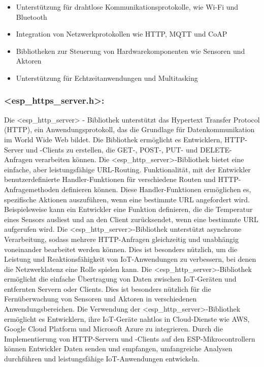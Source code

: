 \begin{itemize}
    \item Unterstützung für drahtlose Kommunikationsprotokolle, wie Wi-Fi und Bluetooth
    \item Integration von Netzwerkprotokollen wie HTTP, MQTT und CoAP
    \item Bibliotheken zur Steuerung von Hardwarekomponenten wie Sensoren und Aktoren
    \item Unterstützung für Echtzeitanwendungen und Multitasking
\end{itemize}

\subsubsection*{<esp\_https\_server.h>:}

Die <esp\_http\_server> - Bibliothek unterstützt das Hypertext Transfer Protocol (HTTP), ein Anwendungsprotokoll, das die Grundlage für Datenkommunikation im World Wide Web bildet. 
Die Bibliothek ermöglicht es Entwicklern, HTTP-Server und -Clients zu erstellen, die GET-, POST-, PUT- und DELETE-Anfragen verarbeiten können.
Die <esp\_http\_server>-Bibliothek bietet eine einfache, aber leistungsfähige URL-Routing.
Funktionalität, mit der Entwickler benutzerdefinierte Handler-Funktionen für verschiedene Routen und HTTP-Anfragemethoden definieren können. 
Diese Handler-Funktionen ermöglichen es, spezifische Aktionen auszuführen, wenn eine bestimmte URL angefordert wird. 
Beispielsweise kann ein Entwickler eine Funktion definieren, die die Temperatur eines Sensors ausliest und an den Client zurücksendet, wenn eine bestimmte URL aufgerufen wird.
Die <esp\_http\_server>-Bibliothek unterstützt asynchrone Verarbeitung, sodass mehrere HTTP-Anfragen gleichzeitig und unabhängig voneinander bearbeitet werden können. 
Dies ist besonders nützlich, um die Leistung und Reaktionsfähigkeit von IoT-Anwendungen zu verbessern, bei denen die Netzwerklatenz eine Rolle spielen kann.
Die <esp\_http\_server>-Bibliothek ermöglicht die einfache Übertragung von Daten zwischen IoT-Geräten und entfernten Servern oder Clients. 
\newline
Dies ist besonders nützlich für die Fernüberwachung von Sensoren und Aktoren in verschiedenen Anwendungsbereichen.
Die Verwendung der <esp\_http\_server>-Bibliothek ermöglicht es Entwicklern, ihre IoT-Geräte nahtlos in Cloud-Dienste wie AWS, Google Cloud Platform und Microsoft Azure zu integrieren. 
Durch die Implementierung von HTTP-Servern und -Clients auf den ESP-Mikrocontrollern können Entwickler Daten senden und empfangen, umfangreiche Analysen durchführen und leistungsfähige IoT-Anwendungen entwickeln.
